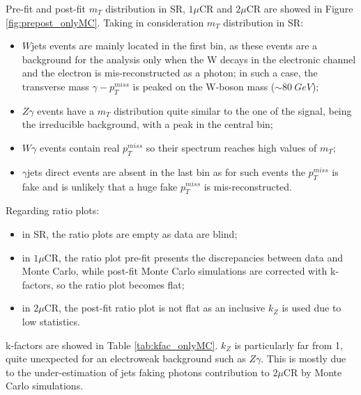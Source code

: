 Pre-fit and post-fit $m_T$ distribution in SR, $1\mu$CR and $2\mu$CR are showed in Figure \ref{fig:prepost_onlyMC}. Taking in consideration $m_T$ distribution in SR: 
\begin{itemize}
    \item $W$jets events are mainly located in the first bin, as these events are a background for the analysis only when the W decays in the electronic channel and the electron is mis-reconstructed as a photon; in such a case, the transverse mass $\gamma-p_T^{miss}$ is peaked on the W-boson mass ($\sim\SI{80}{GeV}$); 
    \item $Z\gamma$ events have a $m_T$ distribution quite similar to the one of the signal, being the irreducible background, with a peak in the central bin; 
    \item $W\gamma$ events contain real $p_T^{miss}$ so their spectrum reaches high values of $m_T$; 
    \item $\gamma$jets direct events are absent in the last bin as for such events the $p_T^{miss}$ is fake and is unlikely that a huge fake $p_T^{miss}$ is mis-reconstructed.
\end{itemize}
Regarding ratio plots: 
\begin{itemize}
    \item in SR, the ratio plots are empty as data are blind; 
    \item in $1\mu$CR, the ratio plot pre-fit presents the discrepancies between data and Monte Carlo, while post-fit Monte Carlo simulations are corrected with k-factors, so the ratio plot becomes flat; 
    \item in $2\mu$CR, the post-fit ratio plot is not flat as an inclusive $k_Z$ is used due to low statistics. 
\end{itemize}


k-factors are showed in Table \ref{tab:kfac_onlyMC}. $k_Z$ is particularly far from 1, quite unexpected for an electroweak background such as $Z\gamma$. This is mostly due to the under-estimation of jets faking photons contribution to $2\mu$CR by Monte Carlo simulations. 


